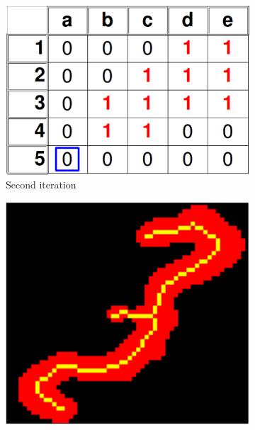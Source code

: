 \documentclass{article}
\begin{document}
\begin{figure}[htb!]
\begin{subfigure}{0.25\textwidth}
		\includegraphics[width=\linewidth]{thick_DNA_4.png}
		\caption{Second iteration}
		\label{fig:end_pixel_recovery3}
	\end{subfigure}
	\begin{subfigure}{0.20\textwidth}
		\includegraphics[width=\linewidth]{thick_thin_before_recovery.png}
		
		\vspace{0.2cm}
		

\end{subfigure}
\end{figure}
\end{document}
